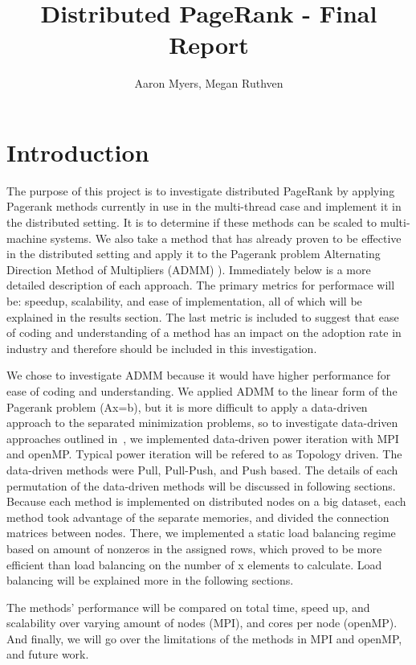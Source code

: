 \documentclass[letterpaper,11pt,onecolumn]{article}
\title{Distributed PageRank - Final Report}
\author{Aaron Myers, Megan Ruthven}
\begin{document}
\maketitle
\tableofcontents
\pagebreak
\section{Introduction}
The purpose of this project is to investigate distributed PageRank by applying Pagerank methods currently in use in the multi-thread case and implement it in the distributed setting. It is to determine if these methods can be scaled to multi-machine systems. We also take a method that has already proven to be effective in the distributed setting and apply it to the Pagerank problem Alternating Direction Method of Multipliers (ADMM) \cite{ADMM}). Immediately below is a more detailed description of each approach. The primary metrics for performace will be: speedup, scalability, and ease of implementation, all of which will be explained in the results section. The last metric is included to suggest that ease of coding and understanding of a method has an impact on the adoption rate in industry and therefore should be included in this investigation.

We chose to investigate ADMM \cite{ADMM} because it would have higher performance for ease of coding and understanding. We applied ADMM to the linear form of the Pagerank problem (Ax=b), but it is more difficult to apply a data-driven approach to the separated minimization problems, so to investigate data-driven approaches outlined in~\cite{Joyce}, we implemented data-driven power iteration with MPI and openMP. Typical power iteration will be refered to as Topology driven. The data-driven methods were Pull, Pull-Push, and Push based. The details of each permutation of the data-driven methods will be discussed in following sections. Because each method is implemented on distributed nodes on a big dataset, each method took advantage of the separate memories, and divided the connection matrices between nodes. There, we implemented a static load balancing regime based on amount of nonzeros in the assigned rows, which proved to be more efficient than load balancing on the number of x elements to calculate. Load balancing will be explained more in the following sections. 

The methods' performance will be compared on total time, speed up, and scalability over varying amount of nodes (MPI), and cores per node (openMP). And finally, we will go over the limitations of the methods in MPI and openMP, and future work. 
\end{document}
